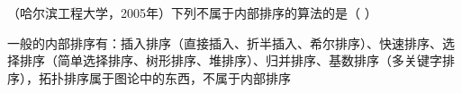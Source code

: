 \question （哈尔滨工程大学，2005年）下列不属于内部排序的算法的是（ ）
\par{}
\begin{solution}一般的内部排序有：插入排序（直接插入、折半插入、希尔排序）、快速排序、选择排序（简单选择排序、树形排序、堆排序）、归并排序、基数排序（多关键字排序），拓扑排序属于图论中的东西，不属于内部排序
\end{solution}
